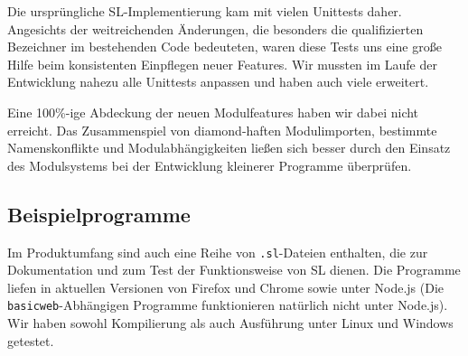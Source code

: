 \documentclass[runningheads]{llncs}
\begin{document}
Die ursprüngliche SL-Implementierung kam mit vielen Unittests daher.
Angesichts der weitreichenden Änderungen, die besonders die qualifizierten
Bezeichner im bestehenden Code bedeuteten, waren diese Tests uns eine große
Hilfe beim konsistenten Einpflegen neuer Features. Wir mussten im Laufe der
Entwicklung nahezu alle Unittests anpassen und haben auch viele erweitert.

Eine 100\%-ige Abdeckung der neuen Modulfeatures haben wir dabei nicht erreicht.
Das Zusammenspiel von diamond-haften Modulimporten, bestimmte Namenskonflikte
und Modulabhängigkeiten ließen sich besser durch den Einsatz des Modulsystems
bei der Entwicklung kleinerer Programme überprüfen.

\subsection{Beispielprogramme}
\label{sec:sampleApps}

Im Produktumfang sind auch eine Reihe von \verb|.sl|-Dateien enthalten, die
zur Dokumentation und zum Test der Funktionsweise von SL dienen. Die Programme
liefen in aktuellen Versionen von Firefox und Chrome sowie unter Node.js
(Die \verb|basicweb|-Abhängigen Programme funktionieren natürlich nicht unter
Node.js). Wir haben sowohl Kompilierung als auch Ausführung unter Linux und
Windows getestet.
\end{document}

